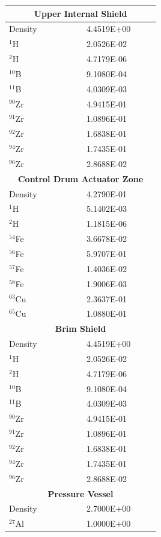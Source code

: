 \documentclass[8pt,a4paper]{article}
\begin{document}
\begin{longtable}{|m{0.3\linewidth}|m{0.2\linewidth}|}
    \multicolumn{2}{|c|}{\textbf{Upper Internal Shield}}\\\hline
    Density & \SI{4.4519E+00}{} \\
    $^{1}$H & \SI{2.0526E-02}{} \\
    $^{2}$H & \SI{4.7179E-06}{} \\
    $^{10}$B & \SI{9.1080E-04}{} \\
    $^{11}$B & \SI{4.0309E-03}{} \\
    $^{90}$Zr & \SI{4.9415E-01}{} \\
    $^{91}$Zr & \SI{1.0896E-01}{} \\
    $^{92}$Zr & \SI{1.6838E-01}{} \\
    $^{94}$Zr & \SI{1.7435E-01}{} \\
    $^{96}$Zr & \SI{2.8688E-02}{} \\\hline
    \multicolumn{2}{|c|}{\textbf{Control Drum Actuator Zone}}\\\hline
    Density & \SI{4.2790E-01}{} \\
    $^{1}$H & \SI{5.1402E-03}{} \\
    $^{2}$H & \SI{1.1815E-06}{} \\
    $^{54}$Fe & \SI{3.6678E-02}{} \\
    $^{56}$Fe & \SI{5.9707E-01}{} \\
    $^{57}$Fe & \SI{1.4036E-02}{} \\
    $^{58}$Fe & \SI{1.9006E-03}{} \\
    $^{63}$Cu & \SI{2.3637E-01}{} \\
    $^{65}$Cu & \SI{1.0880E-01}{} \\\hline
    \multicolumn{2}{|c|}{\textbf{Brim Shield}}\\\hline
    Density & \SI{4.4519E+00}{} \\
    $^{1}$H & \SI{2.0526E-02}{} \\
    $^{2}$H & \SI{4.7179E-06}{} \\
    $^{10}$B & \SI{9.1080E-04}{} \\
    $^{11}$B & \SI{4.0309E-03}{} \\
    $^{90}$Zr & \SI{4.9415E-01}{} \\
    $^{91}$Zr & \SI{1.0896E-01}{} \\
    $^{92}$Zr & \SI{1.6838E-01}{} \\
    $^{94}$Zr & \SI{1.7435E-01}{} \\
    $^{96}$Zr & \SI{2.8688E-02}{} \\\hline
    \multicolumn{2}{|c|}{\textbf{Pressure Vessel}}\\\hline
    Density & \SI{2.7000E+00}{} \\
    $^{27}$Al & \SI{1.0000E+00}{} 
\end{longtable}
\end{document}
